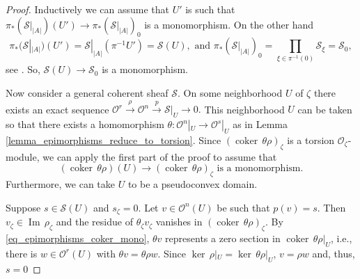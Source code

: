 \documentclass{amsart}
\numberwithin{equation}{section}
\theoremstyle{definition}
\theoremstyle{plain}
\theoremstyle{remark}
\begin{document}
\begin{proof}
Inductively we can assume that $U'$ is such that 
$\pi_*({\ensuremath{\mathcal{{S}}}}|_{|A|})(U')\rightarrow\pi_*({\ensuremath{\mathcal{{S}}}}|_{|A|})_0$ 
is a monomorphism.
On the other hand 
\[
\pi_*({\ensuremath{\mathcal{{S}}}}|_{|A|})(U')={\ensuremath{\mathcal{{S}}}}|_{|A|}(\pi^{-1}U')
={\ensuremath{\mathcal{{S}}}}(U), \text{ and } \pi_*({\ensuremath{\mathcal{{S}}}}|_{|A|})_0=\prod_{\xi\in\pi^{-1}(0)}{\ensuremath{\mathcal{{S}}}}_\xi={\ensuremath{\mathcal{{S}}}}_0,
\]
see \cite[Section 2.3.3]{GR}. So, ${\ensuremath{\mathcal{{S}}}}(U)\rightarrow{\ensuremath{\mathcal{{S}}}}_0$ is a monomorphism.

Now consider a general coherent sheaf ${\ensuremath{\mathcal{{S}}}}$. On some neighborhood
$U$ of $\zeta$ there exists an exact sequence 
$
{\ensuremath{\mathcal{{O}}}}^r\xrightarrow{\rho}{\ensuremath{\mathcal{{O}}}}^n\xrightarrow{p} {\ensuremath{\mathcal{{S}}}}|_U\rightarrow 0.
$
This neighborhood $U$ can be taken so that there exists
 a homomorphism $\theta:{\ensuremath{\mathcal{{O}}}}^n|_U\rightarrow{\ensuremath{\mathcal{{O}}}}^s|_U$ as in Lemma
\ref{lemma_epimorphisms_reduce_to_torsion}. Since $({{\mathop{\mathrm{coker\,}}}} \theta\rho)_\zeta$
is a torsion ${\ensuremath{\mathcal{{O}}}}_\zeta$-module, we can apply the first part of the proof
to assume that
\begin{equation}\label{eq_epimorphisms_coker_mono}
({{\mathop{\mathrm{coker\,}}}} \theta\rho)(U)\rightarrow({{\mathop{\mathrm{coker\,}}}}\theta\rho)_\zeta 
\text{ is a monomorphism.}
\end{equation}
Furthermore, we can take $U$ to be a pseudoconvex domain.

Suppose $s\in{\ensuremath{\mathcal{{S}}}}(U)$ and $s_\zeta=0$. Let $v\in{\ensuremath{\mathcal{{O}}}}^n(U)$ be such
that $p(v)=s$. Then $v_\zeta\in{{\mathop{\mathrm{Im\,}}}} \rho_\zeta$ and
the residue of $\theta_\zeta v_\zeta$ 
 vanishes in 
$({{\mathop{\mathrm{coker\,}}}} \theta\rho)_\zeta$.  
 By \eqref{eq_epimorphisms_coker_mono}, $\theta v$ represents a zero
section in ${{\mathop{\mathrm{coker\,}}}} \theta\rho|_U$, i.e., there is $w\in{\ensuremath{\mathcal{{O}}}}^r(U)$ with 
$\theta v=\theta\rho w$. Since ${{\mathop{\mathrm{ker\,}}}} \rho|_U={{\mathop{\mathrm{ker\,}}}} \theta\rho|_U$,
$v=\rho w$ and, thus, $s=0$ 
\end{proof}
\end{document}
